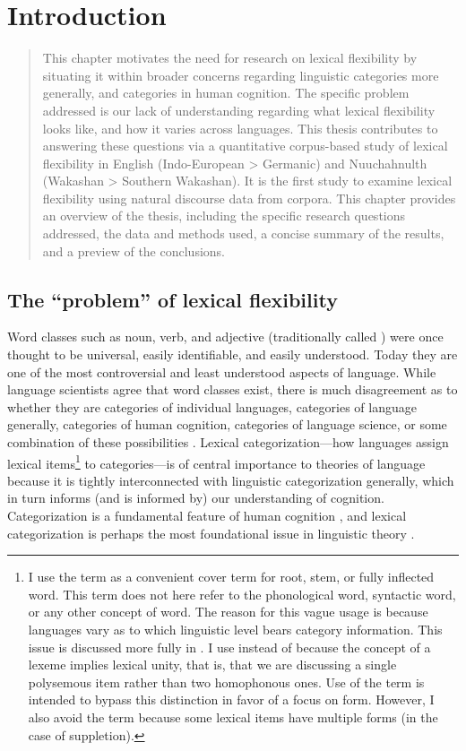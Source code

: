 \chapter{Introduction}
\label{ch:introduction}

\blockquote{This chapter motivates the need for research on lexical flexibility by situating it within broader concerns regarding linguistic categories more generally, and categories in human cognition. The specific problem addressed is our lack of understanding regarding what lexical flexibility looks like, and how it varies across languages. This thesis contributes to answering these questions via a quantitative corpus-based study of lexical flexibility in English (Indo-European > Germanic) and Nuuchahnulth (Wakashan > Southern Wakashan). It is the first study to examine lexical flexibility using natural discourse data from corpora. This chapter provides an overview of the thesis, including the specific research questions addressed, the data and methods used, a concise summary of the results, and a preview of the conclusions.}

\section{The \enquote{problem} of lexical flexibility}
\label{sec:1.1}

Word classes such as noun, verb, and adjective (traditionally called ) were once thought to be universal, easily identifiable, and easily understood. Today they are one of the most controversial and least understood aspects of language. While language scientists agree that word classes exist, there is much disagreement as to whether they are categories of individual languages, categories of language generally, categories of human cognition, categories of language science, or some combination of these possibilities \parencites[166]{Mithun2017}{Haspelmath2018}{Hieberfc}. Lexical categorization—how languages assign lexical items\footnote{I use the term  as a convenient cover term for root, stem, or fully inflected word. This term does not here refer to the phonological word, syntactic word, or any other concept of word. The reason for this vague usage is because languages vary as to which linguistic level bears category information. This issue is discussed more fully in . I use  instead of  because the concept of a lexeme implies lexical unity, that is, that we are discussing a single polysemous item rather than two homophonous ones. Use of the term  is intended to bypass this distinction in favor of a focus on form. However, I also avoid the term  because some lexical items have multiple forms (in the case of suppletion).} to categories—is of central importance to theories of language because it is tightly interconnected with linguistic categorization generally, which in turn informs (and is informed by) our understanding of cognition. Categorization is a fundamental feature of human cognition \parencites[xi]{Taylor2003}[2--3]{LierRijkhoff2013}, and lexical categorization is perhaps the most foundational issue in linguistic theory \parencites[36]{Croft1991}[1]{VapnarskyVeneziano2017b}.


